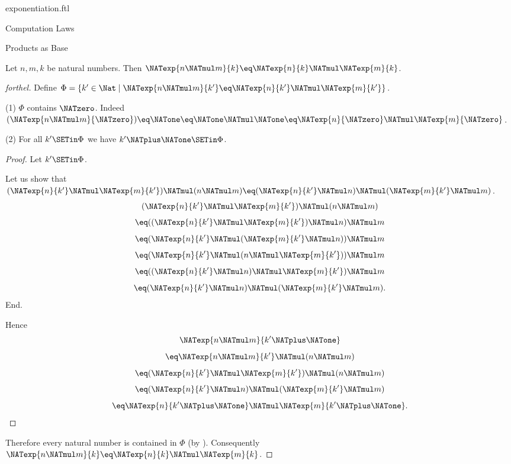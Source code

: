 \documentclass{naproche-library}
\begin{document}
\begin{smodule}[title=Exponentiation]{exponentiation.ftl}
\begin{sfragment}{Computation Laws}
  \begin{sfragment}{Products as Base}
    \begin{proposition}[forthel,id=ARITHMETIC_09_2563032276271104]
      Let $n, m, k$ be natural numbers.
      Then $\NATexp{n \NATmul m}{k} \eq \NATexp{n}{k} \NATmul \NATexp{m}{k}$.
    \end{proposition}
    \begin{proof}[forthel]
      Define $\Phi = \{ k' \in \Nat \mid \NATexp{n \NATmul m}{k'} \eq \NATexp{n}{k'} \NATmul \NATexp{m}{k'} \}$.

      (1) $\Phi$ contains $\NATzero$.
      Indeed $(\NATexp{n \NATmul m}{\NATzero})
        \eq \NATone
        \eq \NATone \NATmul \NATone
        \eq \NATexp{n}{\NATzero} \NATmul \NATexp{m}{\NATzero}$. %

      (2) For all $k' \SETin \Phi$ we have $k' \NATplus \NATone \SETin \Phi$.
      \begin{proof}
        Let $k' \SETin \Phi$.

        Let us show that $(\NATexp{n}{k'} \NATmul \NATexp{m}{k'}) \NATmul (n \NATmul m) \eq (\NATexp{n}{k'} \NATmul n) \NATmul (\NATexp{m}{k'} \NATmul m)$.
          \[  (\NATexp{n}{k'} \NATmul \NATexp{m}{k'}) \NATmul (n \NATmul m)       \]
          \[    \eq ((\NATexp{n}{k'} \NATmul \NATexp{m}{k'}) \NATmul n) \NATmul m   \]
          \[    \eq (\NATexp{n}{k'} \NATmul (\NATexp{m}{k'} \NATmul n)) \NATmul m   \]
          \[    \eq (\NATexp{n}{k'} \NATmul (n \NATmul \NATexp{m}{k'})) \NATmul m   \]
          \[    \eq ((\NATexp{n}{k'} \NATmul n) \NATmul \NATexp{m}{k'}) \NATmul m   \]
          \[    \eq (\NATexp{n}{k'} \NATmul n) \NATmul (\NATexp{m}{k'} \NATmul m).  \]
        End.

        Hence
        \[  \NATexp{n \NATmul m}{k' \NATplus \NATone}                          \]
        \[    \eq \NATexp{n \NATmul m}{k'} \NATmul (n \NATmul m)        \]
        \[    \eq (\NATexp{n}{k'} \NATmul \NATexp{m}{k'}) \NATmul (n \NATmul m)   \]
        \[    \eq (\NATexp{n}{k'} \NATmul n) \NATmul (\NATexp{m}{k'} \NATmul m)   \]
        \[    \eq \NATexp{n}{k' \NATplus \NATone} \NATmul \NATexp{m}{k' \NATplus \NATone}.              \]
      \end{proof}

      Therefore every natural number is contained in $\Phi$ (by ).
      Consequently $\NATexp{n \NATmul m}{k} \eq \NATexp{n}{k} \NATmul \NATexp{m}{k}$.
    \end{proof}
  \end{sfragment}


\end{sfragment}
\end{smodule}
\end{document}
